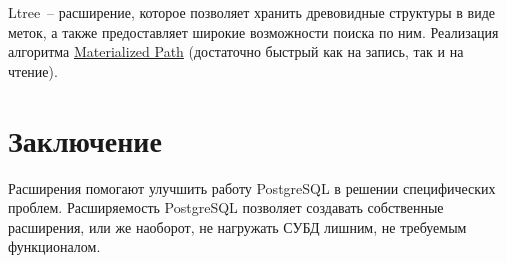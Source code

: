 Ltree~-- расширение, которое позволяет хранить древовидные структуры в виде меток, а также предоставляет широкие возможности поиска по ним. Реализация алгоритма \href{http://en.wikipedia.org/wiki/Materialized\_path}{Materialized Path} (достаточно быстрый как на запись, так и на чтение).

\section{Заключение}

Расширения помогают улучшить работу PostgreSQL в решении специфических проблем. Расширяемость PostgreSQL позволяет создавать собственные расширения, или же наоборот, не нагружать СУБД лишним, не требуемым функционалом.